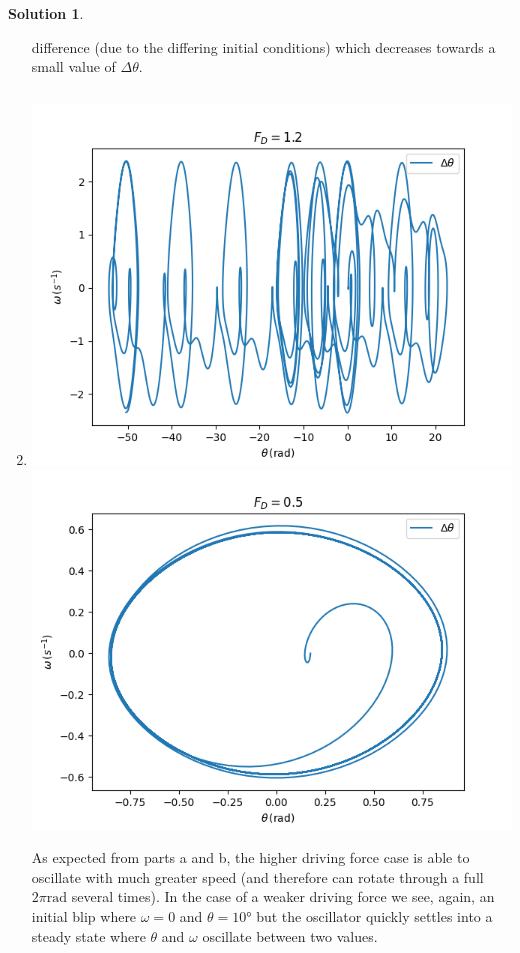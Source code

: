 \documentclass[10pt]{article}
\theoremstyle{definition}
\newtheorem{soln}{Solution}
\begin{document}
\begin{soln}
\begin{enumerate}[label=(\alph*)]
                  difference (due to the differing initial conditions) which decreases towards a small value of $\Delta \theta$. 
            \item \inputminted[breaklines, autogobble]{python3}{./python/q2/q2c.py}
                  \begin{center}
                        \includegraphics[scale=0.75]{Figure_7-1.png}
                        \includegraphics[scale=0.75]{Figure_7-2.png}
                  \end{center}
                  As expected from parts a and b, the higher driving force case is able to oscillate with much greater speed (and therefore can rotate through a full $2\pi\unit{\radian}$ several times).
                  In the case of a weaker driving force we see, again, an initial blip where $\omega=0$ and $\theta=10\unit{\degree}$ but the oscillator quickly settles into a steady
                  state where $\theta$ and $\omega$ oscillate between two values.
      \end{enumerate}
\end{soln}
\end{document}
